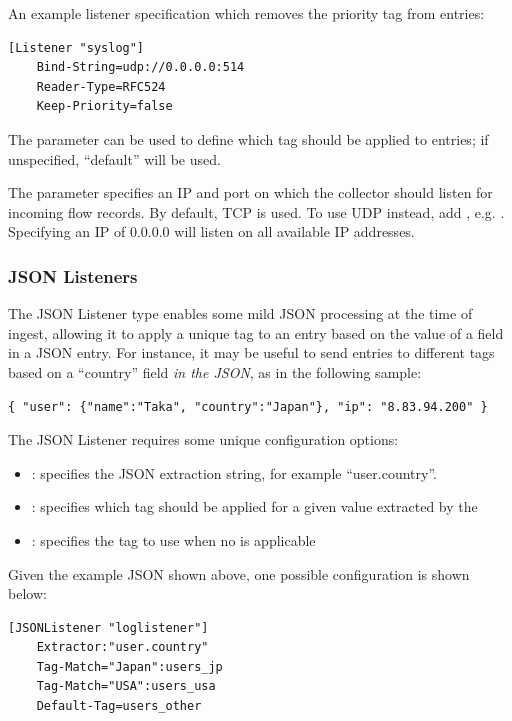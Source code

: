 An example listener specification which removes the priority tag from
entries:

\begin{Verbatim}[breaklines=true]
[Listener "syslog"]
    Bind-String=udp://0.0.0.0:514
    Reader-Type=RFC524
    Keep-Priority=false
\end{Verbatim}

The  parameter can be used to define which tag should be
applied to entries; if unspecified, ``default'' will be used.

The  parameter specifies an IP and port on which
the collector should listen for incoming flow records. By default, TCP is used.
To use UDP instead, add , e.g. .
Specifying an IP of 0.0.0.0 will listen on all available IP addresses.

\subsubsection*{JSON Listeners}

The JSON Listener type enables some mild JSON processing at the time of
ingest, allowing it to apply a unique tag to an entry based on the value
of a field in a JSON entry. For instance, it may be useful to send
entries to different tags based on a ``country'' field \emph{in the JSON},
as in the following sample:

\begin{Verbatim}[breaklines=true]
{ "user": {"name":"Taka", "country":"Japan"}, "ip": "8.83.94.200" }
\end{Verbatim}

The JSON Listener requires some unique configuration options:

\begin{itemize}
\item
  : specifies the JSON extraction string, for example
  ``user.country''.
\item
  : specifies which tag should be applied for a given value
  extracted by the 
\item
  : specifies the tag to use when no  is
  applicable
\end{itemize}

Given the example JSON shown above, one possible configuration is shown
below:

\begin{Verbatim}[breaklines=true]
[JSONListener "loglistener"]
    Extractor:"user.country"
    Tag-Match="Japan":users_jp
    Tag-Match="USA":users_usa
    Default-Tag=users_other
\end{Verbatim}

